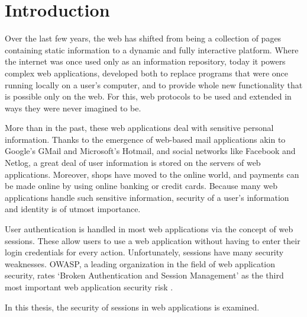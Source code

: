 \chapter{Introduction} %

Over the last few years, the web has shifted from being a collection of pages containing static information to a dynamic and fully interactive platform. Where the internet was once used only as an information repository, today it powers complex web applications, developed both to replace programs that were once running locally on a user's computer, and to provide whole new functionality that is possible only on the web. For this, web protocols to be used and extended in ways they were never imagined to be.

More than in the past, these web applications deal with sensitive personal information. Thanks to the emergence of web-based mail applications akin to Google's GMail and Microsoft's Hotmail, and social networks like Facebook and Netlog, a great deal of user information is stored on the servers of web applications. Moreover, shops have moved to the online world, and payments can be made online by using online banking or credit cards. Because many web applications handle such sensitive information, security of a user's information and identity is of utmost importance.

User authentication is handled in most web applications via the concept of web sessions. These allow users to use a web application without having to enter their login credentials for every action. Unfortunately, sessions have many security weaknesses. OWASP, a leading organization in the field of web application security, rates `Broken Authentication and Session Management' as the third most important web application security risk \cite{Williams2010}.

In this thesis, the security of sessions in web applications is examined.

